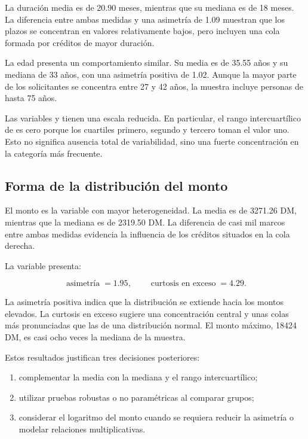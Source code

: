 La duración media es de \num{20.90} meses, mientras que su mediana es de
\num{18} meses. La diferencia entre ambas medidas y una asimetría de
\num{1.09} muestran que los plazos se concentran en valores relativamente
bajos, pero incluyen una cola formada por créditos de mayor duración.

La edad presenta un comportamiento similar. Su media es de
\num{35.55} años y su mediana de \num{33} años, con una asimetría
positiva de \num{1.02}. Aunque la mayor parte de los solicitantes se
concentra entre \num{27} y \num{42} años, la muestra incluye personas de
hasta \num{75} años.

Las variables  y
 tienen una escala reducida. En particular, el
rango intercuartílico de  es cero porque los
cuartiles primero, segundo y tercero toman el valor uno. Esto no significa
ausencia total de variabilidad, sino una fuerte concentración en la
categoría más frecuente.

\subsection{Forma de la distribución del monto}

El monto es la variable con mayor heterogeneidad. La media es de
\num{3271.26} DM, mientras que la mediana es de \num{2319.50} DM. La
diferencia de casi mil marcos entre ambas medidas evidencia la influencia
de los créditos situados en la cola derecha.

La variable presenta:

\[
\operatorname{asimetría}=\num{1.95},
\qquad
\operatorname{curtosis\ en\ exceso}=\num{4.29}.
\]

La asimetría positiva indica que la distribución se extiende hacia los
montos elevados. La curtosis en exceso sugiere una concentración central
y unas colas más pronunciadas que las de una distribución normal. El
monto máximo, \num{18424} DM, es casi ocho veces la mediana de la
muestra.

Estos resultados justifican tres decisiones posteriores:

\begin{enumerate}
    \item complementar la media con la mediana y el rango
    intercuartílico;

    \item utilizar pruebas robustas o no paramétricas al comparar
    grupos;

    \item considerar el logaritmo del monto cuando se requiera reducir
    la asimetría o modelar relaciones multiplicativas.
\end{enumerate}

